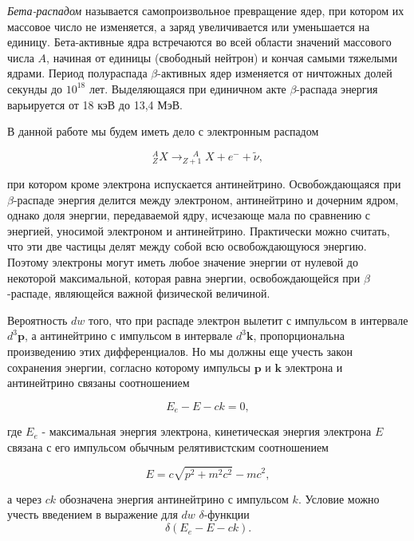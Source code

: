 \documentclass[a4paper, 12pt]{article}
\begin{document}
    \textit{Бета-распадом} называется самопроизвольное превращение ядер, при котором их массовое число не изменяется, а заряд увеличивается или уменьшается на единицу. Бета-активные ядра встречаются во всей области значений массового числа $A$, начиная от единицы (свободный нейтрон) и кончая самыми тяжелыми ядрами. Период полураспада $\beta$-активных ядер изменяется от ничтожных долей секунды до $10^{18}$ лет. Выделяющаяся при единичном акте $\beta$-распада энергия варьируется от 18 кэВ до 13,4 МэВ.

    В данной работе мы будем иметь дело с электронным распадом

    \begin{equation*}
        ^A_ZX \rightarrow ^{\; \; \; \; \: A}_{Z+1}X + e^- + \widetilde{\nu},
    \end{equation*}

    при котором кроме электрона испускается антинейтрино. Освобождающаяся при $\beta$-распаде энергия делится между электроном, антинейтрино и дочерним ядром, однако доля энергии, передаваемой ядру, исчезающе мала по сравнению с энергией, уносимой электроном и антинейтрино. Практически можно считать, что эти две частицы делят между собой всю освобождающуюся энергию. Поэтому электроны могут иметь любое значение энергии  от нулевой до некоторой максимальной, которая равна энергии, освобождающейся при $\beta$-распаде, являющейся важной физической величиной.

    Вероятность $dw$ того, что при распаде электрон вылетит с импульсом в интервале $d^3\mathbf{p}$, а антинейтрино с импульсом в интервале $d^3\mathbf{k}$, пропорциональна произведению этих дифференциалов. Но мы должны еще учесть закон сохранения энергии, согласно которому импульсы $\mathbf{p}$ и $\mathbf{k}$ электрона и антинейтрино связаны соотношением

    \begin{equation}
        E_e - E - ck = 0,
    \end{equation}

    где $E_e$ - максимальная энергия электрона, кинетическая энергия электрона $E$ связана с его импульсом обычным релятивистским соотношением

    \begin{equation}
        E = c\sqrt{p^2 + m^2c^2} - mc^2,
    \end{equation}

    а через $ck$ обозначена энергия антинейтрино с импульсом $k$. Условие можно учесть введением в выражение для $dw$ $\delta$-функции
    \begin{equation}
        \delta (E_e - E - ck).
    \end{equation}
\end{document}
